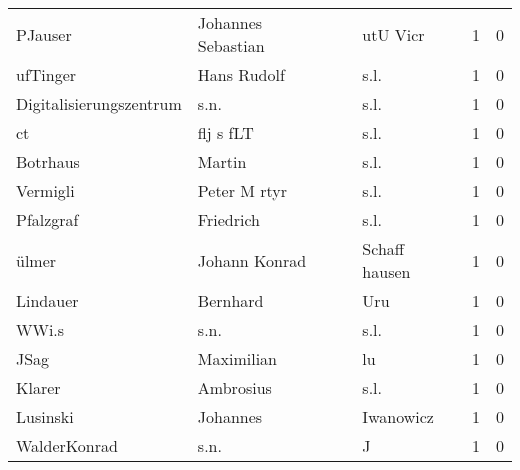 \begin{center}
\begin{tiny}
\begin{longtabu}{llllrr}
                  PJauser &                 Johannes Sebastian &             &                                    utU Vicr &          1 &         0 \\
                 ufTinger &                        Hans Rudolf &             &                                        s.l. &          1 &         0 \\
  Digitalisierungszentrum &                               s.n. &             &                                        s.l. &          1 &         0 \\
                       ct &                          flj s fLT &             &                                        s.l. &          1 &         0 \\
                 Botrhaus &                             Martin &             &                                        s.l. &          1 &         0 \\
                 Vermigli &                       Peter M rtyr &             &                                        s.l. &          1 &         0 \\
                Pfalzgraf &                          Friedrich &             &                                        s.l. &          1 &         0 \\
                    ülmer &                      Johann Konrad &             &                               Schaff hausen &          1 &         0 \\
                 Lindauer &                           Bernhard &             &                                         Uru &          1 &         0 \\
                    WWi.s &                               s.n. &             &                                        s.l. &          1 &         0 \\
                     JSag &                         Maximilian &             &                                          lu &          1 &         0 \\
                   Klarer &                          Ambrosius &             &                                        s.l. &          1 &         0 \\
                 Lusinski &                           Johannes &             &                                   Iwanowicz &          1 &         0 \\
             WalderKonrad &                               s.n. &             &                                           J &          1 &         0 \\

\end{longtabu}
\end{tiny}
\end{center}
